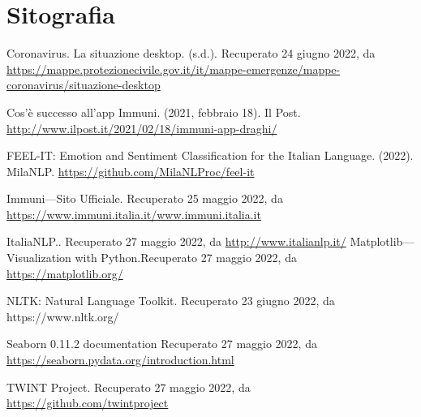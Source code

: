 \chapter*{Sitografia }

Coronavirus. La situazione desktop. (s.d.). Recuperato 24 giugno 2022, da \url{https://mappe.protezionecivile.gov.it/it/mappe-emergenze/mappe-coronavirus/situazione-desktop}

Cos’è successo all’app Immuni. (2021, febbraio 18). Il Post.
\url{http://www.ilpost.it/2021/02/18/immuni-app-draghi/}

FEEL-IT: Emotion and Sentiment Classification for the Italian Language. (2022). MilaNLP. \url{https://github.com/MilaNLProc/feel-it}

Immuni—Sito Ufficiale. Recuperato 25 maggio 2022, da \url{https://www.immuni.italia.it/www.immuni.italia.it}

ItaliaNLP.. Recuperato 27 maggio 2022, da \url{http://www.italianlp.it/}
Matplotlib—Visualization with Python.Recuperato 27 maggio 2022, da \url{https://matplotlib.org/}

NLTK: Natural Language Toolkit. Recuperato 23 giugno 2022, da https://www.nltk.org/

Seaborn 0.11.2 documentation Recuperato 27 maggio 2022, da \url{https://seaborn.pydata.org/introduction.html}


TWINT Project. Recuperato 27 maggio 2022, da \url{https://github.com/twintproject}